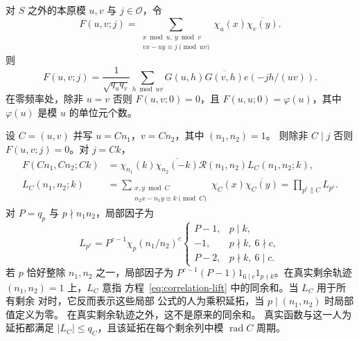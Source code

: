 \begin{lemma}[完整相关性与公共因子]\label{lem:full-correlation}
对 $S$ 之外的本原模 $u,v$ 与 $j\in\mathcal O$，令
\begin{equation}
 F(u,v;j)
 =\sum_{\substack{x\bmod u,\ y\bmod v\\
                    vx-uy\equiv j\pmod{uv}}}
       \chi_u(x)\overline{\chi_v(y)}.
 \label{old-eq:2.11}
\end{equation}
则
\[
 F(u,v;j)=\frac1{\sqrt{q_uq_v}}\sum_{h\bmod uv}
 G(u,h)\overline{G(v,h)}e(-jh/(uv)).
\]
在零频率处，除非 $u=v$ 否则 $F(u,v;0)=0$，且
$F(u,u;0)=\varphi(u)$，其中 $\varphi(u)$ 是模 $u$ 的单位元个数。

设 $C=(u,v)$ 并写 $u=Cn_1$，$v=Cn_2$，其中 $(n_1,n_2)=1$。
则除非 $C\mid j$ 否则 $F(u,v;j)=0$。对 $j=Ck$，
\begin{equation}
 \begin{aligned}
 F(Cn_1,Cn_2;Ck)
 &=\chi_{n_1}(k)\overline{\chi_{n_2}(-k)}
      \mathcal R(n_1,n_2)L_C(n_1,n_2;k),\\
 L_C(n_1,n_2;k)
 &=\sum_{\substack{x,y\bmod C\\n_2x-n_1y\equiv k\pmod C}}
       \chi_C(x)\overline{\chi_C(y)}
   =\prod_{p^c\parallel C}L_{p^c}.
 \end{aligned}
 \label{eq:correlation-lift}
\end{equation}
对 $P=q_p$ 与 $p\nmid n_1n_2$，局部因子为
\begin{equation}
 L_{p^c}=P^{c-1}\chi_p(n_1/n_2)^c
 \begin{cases}
 P-1,&p\mid k,\\
 -1,&p\nmid k,\ 6\nmid c,\\
 P-2,&p\nmid k,\ 6\mid c.
 \end{cases}
 \label{eq:correlation-local}
\end{equation}
若 $p$ 恰好整除 $n_1,n_2$ 之一，局部因子为
$P^{c-1}(P-1)1_{6\mid c}1_{p\nmid k}$。在真实剩余轨迹
$(n_1,n_2)=1$ 上，$L_C$ 意指
方程~\eqref{eq:correlation-lift} 中的同余和。当 $L_C$ 用于所有剩余
对时，它反而表示这些局部
公式的人为乘积延拓，当 $p\mid(n_1,n_2)$ 时局部值定义为零。
在真实剩余轨迹之外，这不是原来的同余和。
真实函数与这一人为延拓都满足
$|L_C|\le q_C$，且该延拓在每个剩余列中模
$\operatorname{rad}C$ 周期。
\end{lemma}

